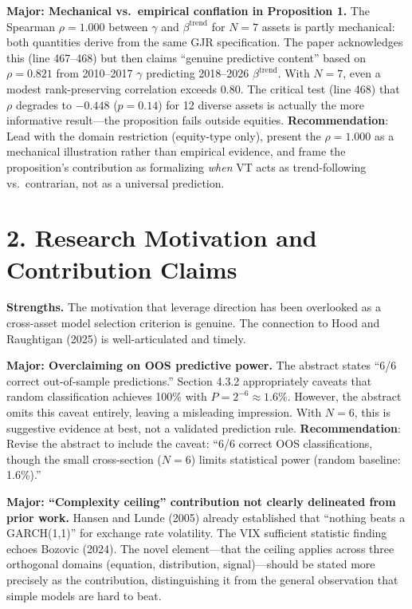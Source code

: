 \documentclass[12pt,a4paper]{article}
\begin{document}
\textcolor{warncolor}{\textbf{Major: Mechanical vs.\ empirical conflation in Proposition 1.}} The Spearman $\rho = 1.000$ between $\gamma$ and $\beta^{\text{trend}}$ for $N = 7$ assets is partly mechanical: both quantities derive from the same GJR specification. The paper acknowledges this (line 467--468) but then claims ``genuine predictive content'' based on $\rho = 0.821$ from 2010--2017 $\gamma$ predicting 2018--2026 $\beta^{\text{trend}}$. With $N = 7$, even a modest rank-preserving correlation exceeds 0.80. The critical test (line 468) that $\rho$ degrades to $-0.448$ ($p = 0.14$) for 12 diverse assets is actually the more informative result---the proposition fails outside equities. \textbf{Recommendation}: Lead with the domain restriction (equity-type only), present the $\rho = 1.000$ as a mechanical illustration rather than empirical evidence, and frame the proposition's contribution as formalizing \textit{when} VT acts as trend-following vs.\ contrarian, not as a universal prediction.

\bigskip

\section*{2. Research Motivation and Contribution Claims}

\textcolor{okgreen}{\textbf{Strengths.}} The motivation that leverage direction has been overlooked as a cross-asset model selection criterion is genuine. The connection to Hood and Raughtigan (2025) is well-articulated and timely.

\textcolor{warncolor}{\textbf{Major: Overclaiming on OOS predictive power.}} The abstract states ``6/6 correct out-of-sample predictions.'' Section 4.3.2 appropriately caveats that random classification achieves 100\% with $P = 2^{-6} \approx 1.6\%$. However, the abstract omits this caveat entirely, leaving a misleading impression. With $N = 6$, this is suggestive evidence at best, not a validated prediction rule. \textbf{Recommendation}: Revise the abstract to include the caveat: ``6/6 correct OOS classifications, though the small cross-section ($N = 6$) limits statistical power (random baseline: 1.6\%).''

\textcolor{warncolor}{\textbf{Major: ``Complexity ceiling'' contribution not clearly delineated from prior work.}} Hansen and Lunde (2005) already established that ``nothing beats a GARCH(1,1)'' for exchange rate volatility. The VIX sufficient statistic finding echoes Bozovic (2024). The novel element---that the ceiling applies across three orthogonal domains (equation, distribution, signal)---should be stated more precisely as the contribution, distinguishing it from the general observation that simple models are hard to beat.
\end{document}
